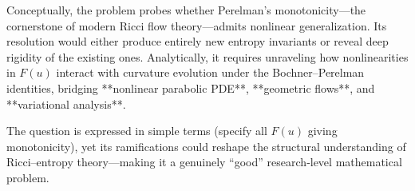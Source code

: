 Conceptually, the problem probes whether Perelman’s monotonicity—the cornerstone of modern Ricci flow theory—admits nonlinear generalization.  Its resolution would either produce entirely new entropy invariants or reveal deep rigidity of the existing ones.  Analytically, it requires unraveling how nonlinearities in \(F(u)\) interact with curvature evolution under the Bochner–Perelman identities, bridging **nonlinear parabolic PDE**, **geometric flows**, and **variational analysis**.  

The question is expressed in simple terms (specify all \(F(u)\) giving monotonicity), yet its ramifications could reshape the structural understanding of Ricci–entropy theory—making it a genuinely “good” research‑level mathematical problem.
